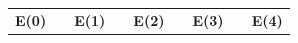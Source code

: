 \documentclass[10pt]{report}
\begin{document}
\begin{tabular}{lllllllll}
	\cline{1-1} \cline{3-3} \cline{5-5} \cline{7-7} \cline{9-9}
	\multicolumn{1}{|c|}{\textbf{E(0)}}                                                                                                                   & \multicolumn{1}{c|}{\textbf{}} & \multicolumn{1}{c|}{\textbf{E(1)}}                                                                                                                       & \multicolumn{1}{c|}{}          & \multicolumn{1}{c|}{\textbf{E(2)}}                                                                                                      & \multicolumn{1}{l|}{} & \multicolumn{1}{c|}{\textbf{E(3)}}                                                                                                                                    & \multicolumn{1}{c|}{\textbf{}} & \multicolumn{1}{c|}{\textbf{E(4)}}                                                                                                                   \\ \cline{1-1} \cline{3-3} \cline{5-5} \cline{7-7} \cline{9-9} 

\end{tabular}
\end{document}
